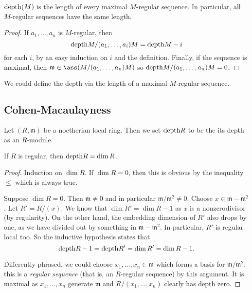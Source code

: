 \begin{corollary} 
$\mathrm{depth}(M)$ is the length of every maximal $M$-regular sequence. In particular,
all $M$-regular sequences have the same length. 
\end{corollary} 

\begin{proof} 
If $a_1, \dots, a_n$ is $M$-regular, then
\[ \mathrm{depth} M/(a_1, \dots, a_i)M = \mathrm{depth} M -i  \]
for each $i$, by an easy induction on $i$ and the definition. Finally, if the sequence is maximal,
then $\mathfrak{m} \in \ass(M/(a_1, \dots, a_n)M)$ so $\mathrm{depth} M/(a_1, \dots,
a_n) M = 0$.
\end{proof} 

\begin{remark} 
We could define the depth via the length of a maximal $M$-regular sequence. 
\end{remark} 


\subsection{Cohen-Macaulayness}

\begin{definition} 
Let $(R, \mathfrak{m})$ be a noetherian local ring. Then 
we set $\mathrm{depth} R$ to be the its depth as an $R$-module.
\end{definition} 




\begin{example} 
If $R$ is regular, then $\mathrm{depth} R = \dim R$.
\end{example} 
\begin{proof} 
Induction on $\dim R$. If $\dim R=0$, then this is obvious by the inequality
$\leq $ which is always true.

Suppose $\dim R = 0$. Then $\mathfrak{m} \neq 0$ and in particular
$\mathfrak{m}/\mathfrak{m}^2 \neq 0$. Choose $x \in \mathfrak{m} -
\mathfrak{m}^2$. Let $R'=R/(x)$. We know that $\dim R' = \dim R-1$ as $x$ is a
nonzerodivisor (by regularity). On the other hand, the embedding dimension of $R'$ also drops
by one, as we have divided out by something in $\mathfrak{m} - \mathfrak{m}^2$.
In particular, $R'$ is regular local too. So the inductive hypothesis states
that
\[\mathrm{depth} R-1 =  \mathrm{depth} R' = \dim R' = \dim R -1.   \]

Differently phrased, we could choose $x_1, \dots, x_n \in
\mathfrak{m}$ which forms a basis for $\mathfrak{m}/\mathfrak{m}^2$; this is a
\emph{regular sequence} (that is, an $R$-regular sequence) by this argument. It
is maximal as $x_1, \dots, x_n$ generate $\mathfrak{m}$ and $R/(x_1, \dots,
x_n)$ clearly has depth zero.
\end{proof} 

